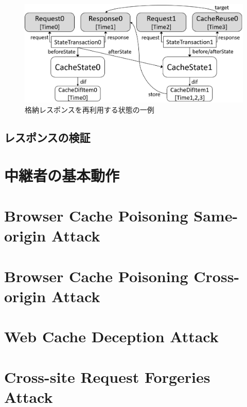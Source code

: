 \documentclass[12pt,a4paper]{jbook}
\begin{document}
\begin{figure}[htb]
\centering
\includegraphics[width=450pt]{./fig/TestReuse.eps}
\caption{格納レスポンスを再利用する状態の一例}
\label{fig:TestReuse}
\end{figure}

\subsection{レスポンスの検証}

\section{中継者の基本動作}

\section{Browser Cache Poisoning Same-origin Attack}

\section{Browser Cache Poisoning Cross-origin Attack}

\section{Web Cache Deception Attack}

\section{Cross-site Request Forgeries Attack}
\end{document}
